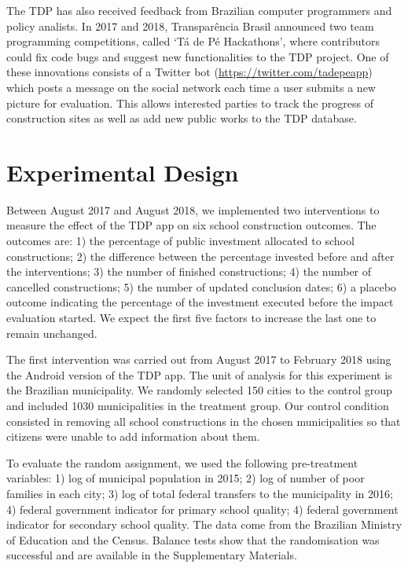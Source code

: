 \documentclass[12pt,a4paper,]{article}
\begin{document}
The TDP has also received feedback from Brazilian computer programmers
and policy analists. In 2017 and 2018, Transparência Brasil announced
two team programming competitions, called `Tá de Pé Hackathons', where
contributors could fix code bugs and suggest new functionalities to the
TDP project. One of these innovations consists of a Twitter bot
(\url{https://twitter.com/tadepeapp}) which posts a message on the
social network each time a user submits a new picture for evaluation.
This allows interested parties to track the progress of construction
sites as well as add new public works to the TDP database.

\hypertarget{experimental-design}{%
\section{Experimental Design}\label{experimental-design}}

\label{sec:design}

Between August 2017 and August 2018, we implemented two interventions to
measure the effect of the TDP app on six school construction outcomes.
The outcomes are: 1) the percentage of public investment allocated to
school constructions; 2) the difference between the percentage invested
before and after the interventions; 3) the number of finished
constructions; 4) the number of cancelled constructions; 5) the number
of updated conclusion dates; 6) a placebo outcome indicating the
percentage of the investment executed before the impact evaluation
started. We expect the first five factors to increase the last one to
remain unchanged.

The first intervention was carried out from August 2017 to February 2018
using the Android version of the TDP app. The unit of analysis for this
experiment is the Brazilian municipality. We randomly selected 150
cities to the control group and included 1030 municipalities in the
treatment group. Our control condition consisted in removing all school
constructions in the chosen municipalities so that citizens were unable
to add information about them.

To evaluate the random assignment, we used the following pre-treatment
variables: 1) log of municipal population in 2015; 2) log of number of
poor families in each city; 3) log of total federal transfers to the
municipality in 2016; 4) federal government indicator for primary school
quality; 4) federal government indicator for secondary school quality.
The data come from the Brazilian Ministry of Education and the Census.
Balance tests show that the randomisation was successful and are
available in the Supplementary Materials.
\end{document}

